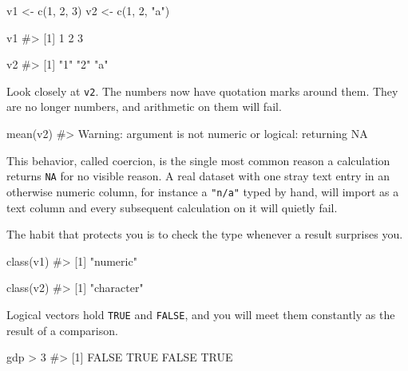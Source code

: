 \documentclass[
  a4paper,
]{scrbook}
\newenvironment{Shaded}{\begin{snugshade}}{\end{snugshade}}
\newcommand{\CommentTok}[1]{\textcolor[rgb]{0.37,0.37,0.37}{#1}}
\newcommand{\DecValTok}[1]{\textcolor[rgb]{0.68,0.00,0.00}{#1}}
\newcommand{\FunctionTok}[1]{\textcolor[rgb]{0.28,0.35,0.67}{#1}}
\newcommand{\NormalTok}[1]{\textcolor[rgb]{0.00,0.23,0.31}{#1}}
\newcommand{\OtherTok}[1]{\textcolor[rgb]{0.00,0.23,0.31}{#1}}
\newcommand{\SpecialCharTok}[1]{\textcolor[rgb]{0.37,0.37,0.37}{#1}}
\newcommand{\StringTok}[1]{\textcolor[rgb]{0.13,0.47,0.30}{#1}}
\begin{document}
\begin{Shaded}
\begin{Highlighting}[]
\NormalTok{v1 }\OtherTok{\textless{}{-}} \FunctionTok{c}\NormalTok{(}\DecValTok{1}\NormalTok{, }\DecValTok{2}\NormalTok{, }\DecValTok{3}\NormalTok{)}
\NormalTok{v2 }\OtherTok{\textless{}{-}} \FunctionTok{c}\NormalTok{(}\DecValTok{1}\NormalTok{, }\DecValTok{2}\NormalTok{, }\StringTok{"a"}\NormalTok{)}

\NormalTok{v1}
\CommentTok{\#\textgreater{} [1] 1 2 3}

\NormalTok{v2}
\CommentTok{\#\textgreater{} [1] "1" "2" "a"}
\end{Highlighting}
\end{Shaded}

Look closely at \texttt{v2}. The numbers now have quotation marks around
them. They are no longer numbers, and arithmetic on them will fail.

\begin{Shaded}
\begin{Highlighting}[]
\FunctionTok{mean}\NormalTok{(v2)}
\CommentTok{\#\textgreater{} Warning: argument is not numeric or logical: returning NA}
\end{Highlighting}
\end{Shaded}

This behavior, called coercion, is the single most common reason a
calculation returns \texttt{NA} for no visible reason. A real dataset
with one stray text entry in an otherwise numeric column, for instance a
\texttt{"n/a"} typed by hand, will import as a text column and every
subsequent calculation on it will quietly fail.

The habit that protects you is to check the type whenever a result
surprises you.

\begin{Shaded}
\begin{Highlighting}[]
\FunctionTok{class}\NormalTok{(v1)}
\CommentTok{\#\textgreater{} [1] "numeric"}

\FunctionTok{class}\NormalTok{(v2)}
\CommentTok{\#\textgreater{} [1] "character"}
\end{Highlighting}
\end{Shaded}

Logical vectors hold \texttt{TRUE} and \texttt{FALSE}, and you will meet
them constantly as the result of a comparison.

\begin{Shaded}
\begin{Highlighting}[]
\NormalTok{gdp }\SpecialCharTok{\textgreater{}} \DecValTok{3}
\CommentTok{\#\textgreater{} [1] FALSE  TRUE FALSE  TRUE}
\end{Highlighting}
\end{Shaded}
\end{document}
